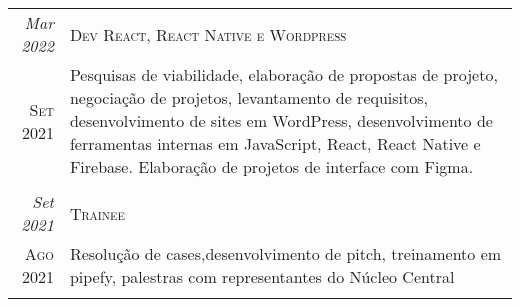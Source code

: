 \begin{framed}
\begin{tabular}{r|p{15cm}}
\emph{Mar 2022}   & \textsc{Dev React, React Native e Wordpress }   \\
\textsc{Set 2021} & \footnotesize{Pesquisas de viabilidade, elaboração de propostas de projeto, negociação de projetos, levantamento de requisitos, desenvolvimento de sites em WordPress, desenvolvimento de ferramentas internas em JavaScript, React, React Native e Firebase. Elaboração de projetos de interface com Figma.} \\
\multicolumn{2}{c}{} \\

\emph{Set 2021}   & \textsc{Trainee} \\
\textsc{Ago 2021} & \footnotesize{Resolução de cases,desenvolvimento de pitch, treinamento em pipefy, palestras com representantes do Núcleo Central}\\
\multicolumn{2}{c}{} \\
\end{tabular}

\end{framed}
